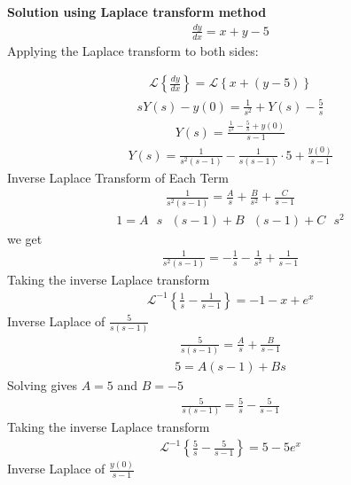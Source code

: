 \documentclass[journal]{IEEEtran}
\begin{document}
\textbf{Solution using Laplace transform method}\\
\begin{align}
    \frac{dy}{dx} = x+y-5
\end{align}
Applying the Laplace transform to both sides:

\begin{align}
    \mathcal{L}\left\{\frac{dy}{dx}\right\} = \mathcal{L}\left\{x + (y - 5)\right\}
\end{align}
\begin{align}
    sY(s) - y(0) = \frac{1}{s^2} + Y(s) - \frac{5}{s}
\end{align}
\begin{align}
    Y(s) = \frac{\frac{1}{s^2} - \frac{5}{s} + y(0)}{s - 1}
\end{align}
\begin{align}
    Y(s) = \frac{1}{s^2 (s - 1)} - \frac{1}{s (s - 1)} \cdot 5 + \frac{y(0)}{s - 1}
\end{align}
Inverse Laplace Transform of Each Term
\begin{align}
    \frac{1}{s^2 (s - 1)} = \frac{A}{s} + \frac{B}{s^2} + \frac{C}{s - 1}
\end{align}
\begin{align}
    1 = A\text{ } s\text{ } (s - 1) + B \text{ }(s - 1) + C \text{ }s^2
\end{align}
we get
\begin{align}
    \frac{1}{s^2 (s - 1)} = -\frac{1}{s} -\frac{1}{s^2} + \frac{1}{s - 1}
\end{align}
Taking the inverse Laplace transform
\begin{align}
    \mathcal{L}^{-1}\left\{ \frac{1}{s} - \frac{1}{s - 1} \right\} = -1 - x + e^x
\end{align}
Inverse Laplace of \( \frac{5}{s (s - 1)} \)
\begin{align}
    \frac{5}{s (s - 1)} = \frac{A}{s} + \frac{B}{s - 1}
\end{align}
\begin{align}
    5 = A (s - 1) + B s
\end{align}
Solving gives \( A = 5 \) and \( B = -5 \)
\begin{align}
    \frac{5}{s (s - 1)} = \frac{5}{s} - \frac{5}{s - 1}
\end{align}
Taking the inverse Laplace transform
\begin{align}
    \mathcal{L}^{-1}\left\{ \frac{5}{s} - \frac{5}{s - 1} \right\} = 5 - 5 e^x
\end{align}
Inverse Laplace of \( \frac{y(0)}{s - 1} \)
\end{document}
